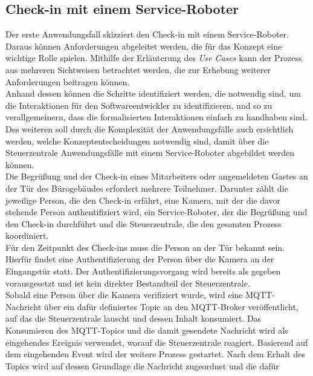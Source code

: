 \subsection{Check-in mit einem Service-Roboter}
\label{subsec:checkin}
    Der erste Anwendungsfall skizziert den Check-in mit einem Service-Roboter. 
    Daraus können Anforderungen abgeleitet werden, die für das Konzept eine wichtige Rolle spielen. Mithilfe der 
    Erläuterung des \textit{Use Cases} kann der Prozess aus mehreren Sichtweisen betrachtet werden, die zur Erhebung weiterer 
    Anforderungen beitragen können. 
    \\ 
    Anhand dessen können die Schritte identifiziert werden, die notwendig sind, um die Interaktionen für den 
    Softwareentwickler zu identifizieren. und so zu verallgemeinern, dass die formalisierten Interaktionen einfach zu 
    handhaben sind. Des weiteren soll durch die Komplexität der Anwendungsfälle auch ersichtlich werden, welche 
    Konzeptentscheidungen notwendig sind, damit über die Steuerzentrale Anwendungsfälle mit einem Service-Roboter abgebildet werden 
    können.
    \\
    \linebreak
    Die Begrüßung und der Check-in eines Mitarbeiters oder angemeldeten Gastes an der Tür des Bürogebäudes erfordert mehrere Teilnehmer. 
    Darunter zählt die jeweilige Person, die den Check-in erfährt, eine Kamera, mit der die davor stehende Person authentifiziert wird, 
    ein Service-Roboter, der die Begrüßung und den Check-in durchführt und die Steuerzentrale, die den gesamten Prozess koordiniert. 
    \\
    \linebreak
    Für den Zeitpunkt des Check-ins muss die Person an 
    der Tür bekannt sein. Hierfür findet eine Authentifizierung der Person über die Kamera an der Eingangstür statt. Der 
    Authentifizierungsvorgang wird bereits als gegeben vorausgesetzt und ist kein direkter Bestandteil der Steuerzentrale. 
    \\
    Sobald eine Person über die Kamera verifiziert wurde, wird eine \acs{MQTT}-Nachricht über ein dafür definiertes Topic 
    an den \acs{MQTT}-Broker veröffentlicht, 
    auf das die Steuerzentrale lauscht und dessen Inhalt konsumiert. Das Konsumieren des \acs{MQTT}-Topics und die damit gesendete 
    Nachricht wird als eingehendes Ereignis verwendet, worauf die Steuerzentrale reagiert. Basierend auf dem eingehenden Event wird der 
    weitere Prozess gestartet. Nach dem Erhalt des Topics wird auf dessen Grundlage die Nachricht zugeordnet und die dafür 
